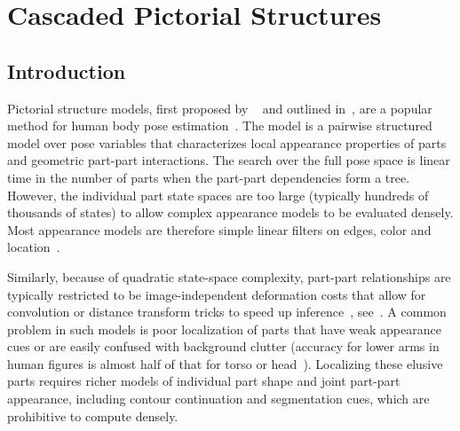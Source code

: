 \chapter{Cascaded Pictorial Structures}\label{sec:CPS}


\section{Introduction}
Pictorial structure models, first proposed by ~\cite{fischler1973ps} and outlined in~, are a popular method for human body pose estimation~\cite{felz05,fergus2005sparse,devacrf,ferrari08,andriluka09}.
The model is a pairwise structured model over pose variables that characterizes 
local appearance properties of parts and geometric part-part interactions.   
The search over the full pose space is linear time in the number of parts when 
the part-part dependencies form a tree.  However,  the individual part 
state spaces are too large (typically hundreds of thousands of states) to allow 
complex appearance models to be evaluated densely.   Most appearance models are 
therefore simple linear filters on edges, color and 
location~\cite{felz05,devacrf,ferrari08,andriluka09}. 

Similarly, because of quadratic state-space complexity, part-part relationships 
are typically restricted to be image-independent deformation costs that allow 
for convolution or distance transform tricks to speed up 
inference~\cite{felz05}, see~. A common problem in such models is 
poor localization of parts that have weak appearance cues or are easily 
confused with background clutter (accuracy for lower arms in human figures is 
almost half of that for torso or head~\cite{andriluka09}).   Localizing these 
elusive parts requires richer models of individual part shape and joint 
part-part appearance, including contour continuation and segmentation cues, 
which are prohibitive to compute densely.

